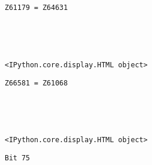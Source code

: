 \documentclass[11pt]{article}
\begin{document}
    
    \begin{Verbatim}[commandchars=\\\{\}]
Z61179 = Z64631

    \end{Verbatim}

    \begin{center}
    \end{center}
    { \hspace*{\fill} \\}
    
    \begin{center}
    \end{center}
    { \hspace*{\fill} \\}
    
    
    \begin{verbatim}
<IPython.core.display.HTML object>
    \end{verbatim}

    
    \begin{Verbatim}[commandchars=\\\{\}]
Z66581 = Z61068

    \end{Verbatim}

    \begin{center}
    \end{center}
    { \hspace*{\fill} \\}
    
    \begin{center}
    \end{center}
    { \hspace*{\fill} \\}
    
    
    \begin{verbatim}
<IPython.core.display.HTML object>
    \end{verbatim}

    
    \begin{Verbatim}[commandchars=\\\{\}]
Bit 75

    \end{Verbatim}
\end{document}
